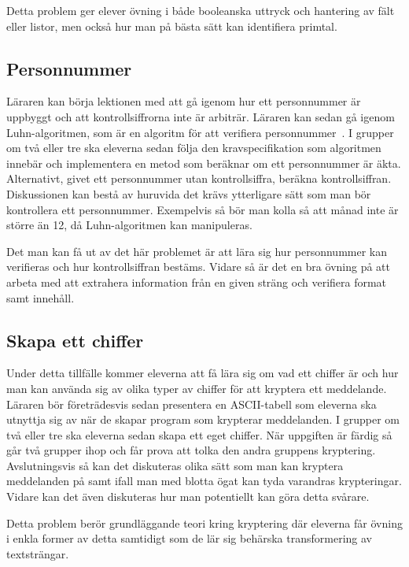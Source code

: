     \textcolor{WildStrawberry}{
        Detta problem ger elever övning i både booleanska uttryck och hantering av fält eller listor, men också hur man på bästa sätt kan identifiera primtal.
        }

\subsection{Personnummer}
    \label{sec:Personnummer}
    
    \textcolor{WildStrawberry}{
        Läraren kan börja lektionen med att gå igenom hur ett personnummer är uppbyggt och att kontrollsiffrorna inte är arbiträr. Läraren kan sedan gå igenom Luhn-algoritmen, som är en algoritm för att verifiera personnummer~\cite{Luhn}. I grupper om två eller tre ska eleverna sedan följa den kravspecifikation som algoritmen innebär och implementera en metod som beräknar om ett personnummer är äkta. Alternativt, givet ett personnummer utan kontrollsiffra, beräkna kontrollsiffran. Diskussionen kan bestå av huruvida det krävs ytterligare sätt som man bör kontrollera ett personnummer. Exempelvis så bör man kolla så att månad inte är större än 12, då Luhn-algoritmen kan manipuleras.}
        
    \textcolor{WildStrawberry}{
        Det man kan få ut av det här problemet är att lära sig hur personnummer kan verifieras och hur kontrollsiffran bestäms. Vidare så är det en bra övning på att arbeta med att extrahera information från en given sträng och verifiera format samt innehåll.
        }

\subsection{Skapa ett chiffer}
    \label{sec:chiffer}
    
    \textcolor{WildStrawberry}{
        Under detta tillfälle kommer eleverna att få lära sig om vad ett chiffer är och hur man kan använda sig av olika typer av chiffer för att kryptera ett meddelande. Läraren bör företrädesvis sedan presentera en ASCII-tabell som eleverna ska utnyttja sig av när de skapar program som krypterar meddelanden. I grupper om två eller tre ska eleverna sedan skapa ett eget chiffer. När uppgiften är färdig så går två grupper ihop och får prova att tolka den andra gruppens kryptering. Avslutningsvis så kan det diskuteras olika sätt som man kan kryptera meddelanden på samt ifall man med blotta ögat kan tyda varandras krypteringar. Vidare kan det även diskuteras hur man potentiellt kan göra detta svårare.}
        
    \textcolor{WildStrawberry}{
        Detta problem berör grundläggande teori kring kryptering där eleverna får övning i enkla former av detta samtidigt som de lär sig behärska transformering av textsträngar.
        }